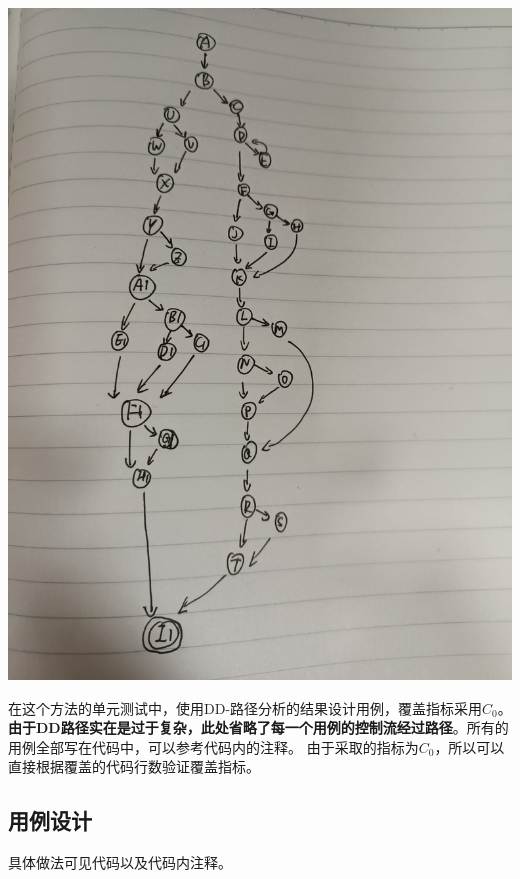\documentclass[12pt, a4paper, oneside]{ctexart}
\begin{document}
\includegraphics[scale=0.06]{screenshots/DD-remove.jpg}

在这个方法的单元测试中，使用DD-路径分析的结果设计用例，覆盖指标采用$C_0$。
\textbf{由于DD路径实在是过于复杂，此处省略了每一个用例的控制流经过路径}。所有的用例全部写在代码中，可以参考代码内的注释。
由于采取的指标为$C_0$，所以可以直接根据覆盖的代码行数验证覆盖指标。

\subsection{用例设计}

具体做法可见代码以及代码内注释。
\end{document}
